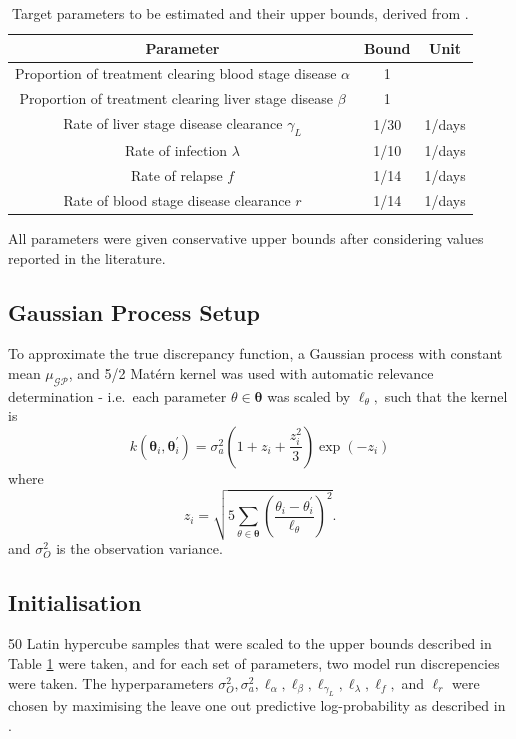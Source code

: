 \begin{table}[htbp]
    \centering
    \begin{tabular}{c |c |c}
        Parameter                                                     & Bound & Unit   \\
        \hline
        Proportion of treatment clearing blood stage disease $\alpha$ & 1     &        \\
        Proportion of treatment clearing liver stage disease $\beta$  & 1     &        \\
        Rate of liver stage disease clearance $\gamma_L$              & 1/30  & 1/days \\
        Rate of infection $\lambda$                                   & 1/10  & 1/days \\
        Rate of relapse $f$                                           & 1/14  & 1/days \\
        Rate of blood stage disease clearance $r$                     & 1/14  & 1/days
    \end{tabular}
    \caption{Target parameters to be estimated and their upper bounds, derived from \cite{champagne_using_2022, white_variation_2016}.}
    \label{table:param_bounds}
\end{table}

All parameters were given conservative upper bounds after considering
values reported in the literature.

\subsection*{Gaussian Process Setup}

To approximate the true discrepancy function, a Gaussian process with constant
mean $\mu_{\mathcal{GP}}$, and 5/2 Mat\'ern kernel was used with automatic
relevance determination - i.e.\ each parameter $\theta\in\bm{\theta}$ was
scaled by $\ell_\theta,$ such
that the kernel is
$$
    k(\bm{\theta}_i, \bm{\theta}_i^\prime)
    = \sigma_a^2 (1 + z_i + \frac{z_i^2}{3})\exp(-z_i)
$$
where
$$
    z_i = \sqrt{
        5 \sum_{\theta\in \bm{\theta}}\left(
        \frac{\theta_i - \theta_i^\prime}{\ell_\theta}
        \right)^2
    }.
$$ and $\sigma_O^2$ is the observation variance.

\subsection*{Initialisation}

50 Latin hypercube samples that were scaled to the upper bounds described in
Table \ref{table:param_bounds} were taken, and for each set of parameters, two
model run discrepencies were taken. The hyper\-parameters
$\sigma_O^2, \sigma_a^2, \ell_\alpha, \ell_\beta, \ell_{\gamma_L}, \ell_\lambda, \ell_f,$
and $\ell_r$ were chosen by maximising the leave one out predictive
log-probability as described in \cite[116]{rasmussen_gaussian_2008}.

